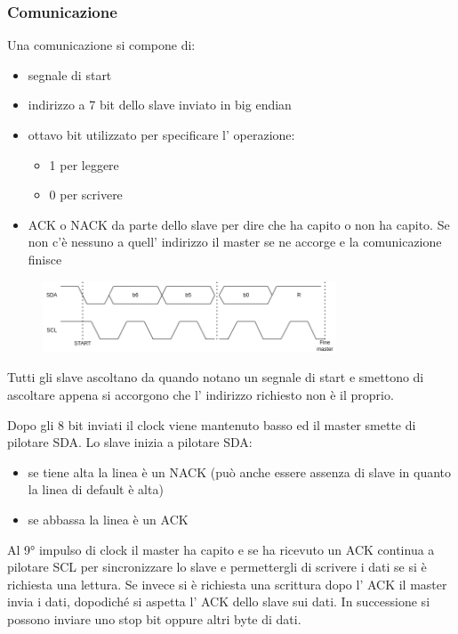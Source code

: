 \subsubsection{Comunicazione}
Una comunicazione si compone di:
\begin{itemize}
    \item segnale di start
    \item indirizzo a 7 bit dello slave inviato in big endian
    \item ottavo bit utilizzato per specificare l' operazione:
    \begin{itemize}
        \item 1 per leggere
        \item 0 per scrivere
    \end{itemize}
    \item ACK o NACK da parte dello slave per dire che ha capito o non ha capito.
    Se non c'è nessuno a quell' indirizzo il master se ne accorge e la comunicazione finisce
\end{itemize}

\begin{figure}[H]
    \centering
    \includegraphics[width=330px]{images/24_I2C-TWI/i2c_address_transmission.png}
\end{figure}

Tutti gli slave ascoltano da quando notano un segnale di start e smettono di ascoltare appena si accorgono che l' indirizzo richiesto non è il proprio.

Dopo gli 8 bit inviati il clock viene mantenuto basso ed il master smette di pilotare SDA.
Lo slave inizia a pilotare SDA:
\begin{itemize}
    \item se tiene alta la linea è un NACK (può anche essere assenza di slave in quanto la linea di default è alta)
    \item se abbassa la linea è un ACK
\end{itemize}

Al 9° impulso di clock il master ha capito e se ha ricevuto un ACK continua a pilotare SCL per sincronizzare lo slave e permettergli di scrivere i dati se si è richiesta una lettura.
Se invece si è richiesta una scrittura dopo l' ACK il master invia i dati, dopodiché si aspetta l' ACK dello slave sui dati.
In successione si possono inviare uno stop bit oppure altri byte di dati.

